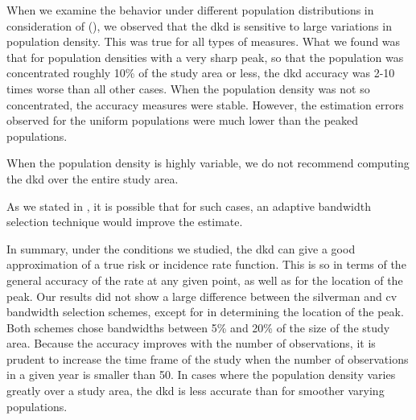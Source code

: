 When we examine the behavior under different population distributions in consideration of  (),
we observed that the \gls{dkd} is sensitive to large variations in population density.
This was true for all types of measures.
What we found was that for population densities with a very sharp peak,
so that the population was concentrated roughly 10\% of the study area or less,
the \gls{dkd} accuracy was 2-10 times worse than all other cases.
When the population density was not so concentrated,
the accuracy measures were stable.
However,
the estimation errors observed for the uniform populations were much lower than the peaked populations.
\begin{rec}
    \label{rec:pop-density}
    When the population density is highly variable,
    we do not recommend computing the \gls{dkd} over the entire study area.
\end{rec}
As we stated in ,
it is possible that for such cases,
an adaptive bandwidth selection technique would improve the estimate.

In summary,
under the conditions we studied,
the \gls{dkd} can give a good approximation of a true \gls{risk} or \gls{incidence rate} function.
This is so in terms of the general accuracy of the rate at any given point,
as well as for the location of the peak.
Our results did not show a large difference between the \gls{silverman} and \gls{cv} bandwidth selection schemes,
except for in determining the location of the peak.
Both schemes chose bandwidths between 5\% and 20\% of the size of the study area.
Because the accuracy improves with the number of observations,
it is prudent to increase the time frame of the study when the number of observations in a given year is smaller than 50.
In cases where the population density varies greatly over a study area,
the \gls{dkd} is less accurate than for smoother varying populations.

